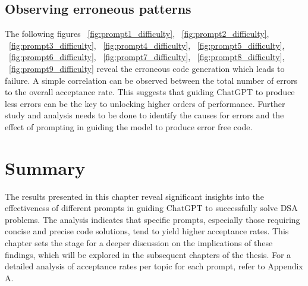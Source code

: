 \subsection{Observing erroneous patterns}
The following figures ~\ref{fig:prompt1_difficulty}, ~\ref{fig:prompt2_difficulty}, ~\ref{fig:prompt3_difficulty}, ~\ref{fig:prompt4_difficulty}, ~\ref{fig:prompt5_difficulty}, ~\ref{fig:prompt6_difficulty}, ~\ref{fig:prompt7_difficulty}, ~\ref{fig:prompt8_difficulty}, ~\ref{fig:prompt9_difficulty} reveal the erroneous code generation which leads to failure. A simple correlation can be observed between the total number of errors to the overall acceptance rate. This suggests that guiding ChatGPT to produce less errors can be the key to unlocking higher orders of performance. Further study and analysis needs to be done to identify the causes for errors and the effect of prompting in guiding the model to produce error free code. 

\section{Summary}
The results presented in this chapter reveal significant insights into the effectiveness of different prompts in guiding ChatGPT to successfully solve DSA problems. The analysis indicates that specific prompts, especially those requiring concise and precise code solutions, tend to yield higher acceptance rates. This chapter sets the stage for a deeper discussion on the implications of these findings, which will be explored in the subsequent chapters of the thesis. For a detailed analysis of acceptance rates per topic for each prompt, refer to Appendix A.
